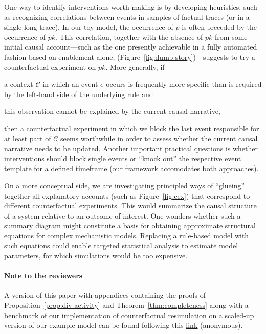 One way to identify interventions worth making is by developing heuristics, such
as recognizing correlations between events in samples of factual traces (or in a
single long trace). In our toy model, the occurrence of $p$ is often preceded by
the occurrence of $pk$. This correlation, together with the absence of $pk$ from
some initial causal account---such as the one presently achievable in a fully
automated fashion based on enablement alone,
(Figure~\ref{fig:dumb-story})---suggests to try a counterfactual experiment on
$pk$. More generally, if \begin{inparaenum}[(i)] \item a context $\mathcal C$ in
which an event $e$ occurs is frequently more specific than is required by the
left-hand side of the underlying rule and \item this observation cannot be
explained by the current causal narrative, \end{inparaenum} then a
counterfactual experiment in which we block the last event responsible for at
least part of $\mathcal C$ seems worthwhile in order to assess whether the
current causal narrative needs to be updated.  Another important practical
questions is whether interventions should block single events or ``knock out''
the respective event template for a defined timeframe (our framework accomodates
both approaches).

On a more conceptual side, we are investigating principled ways of ``glueing''
together all explanatory accounts (such as Figure~\ref{fig:cex}) that correspond
to different counterfactual experiments. This would summarize the causal
structure of a system relative to an outcome of interest. One wonders whether
such a summary diagram might constitute a basis for obtaining approximate
structural equations for complex mechanistic models. Replacing a rule-based
model with such equations could enable targeted statistical analysis to estimate
model parameters, for which simulations would be too expensive.

\ifreview
\ifincludeappendices
\else
\paragraph{Note to the reviewers}
A version of this paper with appendices containing the proofs of
Proposition~\ref{prop:div-activity} and Theorem~\ref{thm:completeness}
along with a benchmark of our implementation of counterfactual
resimulation on a scaled-up version of our example model can be found
following this
\underline{\href{https://www.dropbox.com/sh/2fwji0its0o0ciq/AABfLZ-GO2wCE2x3h3ulUbB-a?dl=0}{link}}
(anonymous).
\fi
\fi